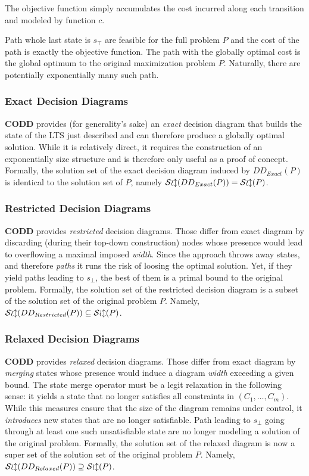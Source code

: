 \documentclass[11pt]{article}
\begin{document}
The objective function simply accumulates the cost incurred along each transition and modeled by function \(c\).

Path whole last state is \(s_\top\) are feasible for the full problem \(P\) and the cost of the path is exactly the objective function. The path with the globally optimal cost
is the global optimum to the original maximization problem \(P\). Naturally, there are potentially exponentially many such path. 

\subsubsection{Exact Decision Diagrams}
\label{sec:orgda9b0a0}
\textbf{CODD} provides (for generality's sake) an \emph{exact} decision diagram that builds the state of the LTS just described and can therefore produce a globally optimal solution. While it is relatively direct, it requires the construction of an exponentially size structure and is therefore only useful as a proof of concept. Formally, the solution set of the
exact decision diagram induced by \(DD_{Exact}(P)\) is identical to the solution set of \(P\), namely \({\cal Sol}(DD_{Exact}(P)) = {\cal Sol}(P)\).

\subsubsection{Restricted Decision Diagrams}
\label{sec:org13d2538}
\textbf{CODD} provides \emph{restricted} decision diagrams. Those differ from exact diagram by discarding (during their top-down construction) nodes whose presence would lead to overflowing a maximal imposed \emph{width}. Since the approach throws away states, and therefore \emph{paths} it runs the risk of loosing the optimal solution. Yet, if they yield  paths leading to \(s_\bot\), the best of them is a primal bound to the original problem.
Formally, the solution set of the restricted decision diagram is a subset of the solution set of the original problem \(P\). Namely,
\({\cal Sol}(DD_{Restricted}(P)) \subseteq {\cal Sol}(P)\).

\subsubsection{Relaxed Decision Diagrams}
\label{sec:orgbe0a0f7}
\textbf{CODD} provides \emph{relaxed} decision diagrams. Those differ from exact diagram by \emph{merging} states whose presence would induce a diagram \emph{width} exceeding a given bound. The state merge operator must be a legit relaxation in the following sense: it yields a state that no longer satisfies all constraints in \((C_1,\ldots,C_m)\). While this measures ensure that the size of the diagram remains under control, it \emph{introduces} new states that are no longer satisfiable. Path leading to \(s_\bot\) going through at least one such unsatisfiable state are no longer modeling a solution of the original problem. Formally, the solution set of the relaxed diagram is now a super set of the solution set of the original problem \(P\). Namely,
\({\cal Sol}(DD_{Relaxed}(P)) \supseteq {\cal Sol}(P)\).
\end{document}
